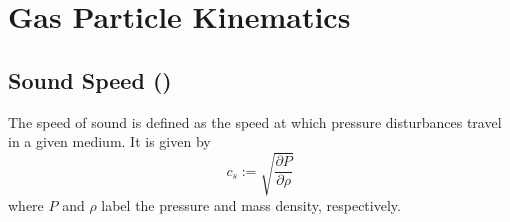          \\
         \\  %


        \clearpage
        




\newpage\section{Gas Particle Kinematics}


    \subsection{Sound Speed ()}

        The speed of sound is defined as the speed at which pressure disturbances travel in a 
        given medium. It is given by 
        \begin{equation}
            \label{eq:general_definition_of_sound_speed}
            c_s := \sqrt{\frac{\partial P}{\partial \rho}}
        \end{equation}
        where $P$ and $\rho$ label the pressure and mass density, respectively. \\
        
